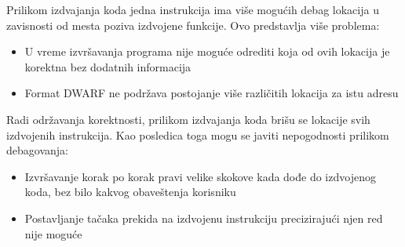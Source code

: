 \documentclass[12pt,oneside]{memoir}
\begin{document}

Prilikom izdvajanja koda jedna instrukcija ima više mogućih debag lokacija u zavisnosti od mesta poziva izdvojene funkcije.
Ovo predstavlja više problema:
\begin{itemize}
  \item U vreme izvršavanja programa nije moguće odrediti koja od ovih lokacija je korektna bez dodatnih informacija
  \item Format DWARF ne podržava postojanje više različitih lokacija za istu adresu \cite{dwarf5}
\end{itemize}
Radi održavanja korektnosti, prilikom izdvajanja koda brišu se lokacije svih izdvojenih instrukcija.
Kao posledica toga mogu se javiti nepogodnosti prilikom debagovanja:
\begin{itemize}
  \item Izvršavanje korak po korak pravi velike skokove kada dođe do izdvojenog koda, bez bilo kakvog obaveštenja korisniku
  \item Postavljanje tačaka prekida na izdvojenu instrukciju precizirajući njen red nije moguće
\end{itemize}
\end{document}
